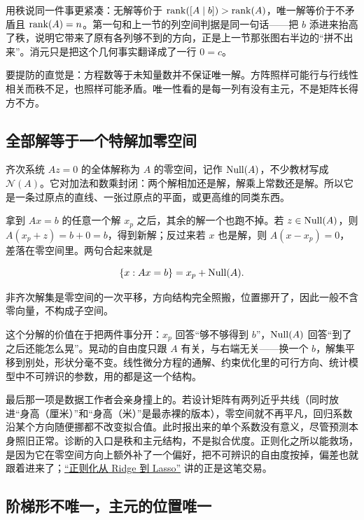 用秩说同一件事更紧凑：无解等价于 \(\operatorname{rank}([A\mid b])>\operatorname{rank}(A)\)，唯一解等价于不矛盾且 \(\operatorname{rank}(A)=n\)。第一句和上一节的列空间判据是同一句话——把 \(b\) 添进来抬高了秩，说明它带来了原有各列够不到的方向，正是上一节那张图右半边的``拼不出来''。消元只是把这个几何事实翻译成了一行 \(0=c\)。

要提防的直觉是：方程数等于未知量数并不保证唯一解。方阵照样可能行与行线性相关而秩不足，也照样可能矛盾。唯一性看的是每一列有没有主元，不是矩阵长得方不方。

\subsection{全部解等于一个特解加零空间}

齐次系统 \(Az=0\) 的全体解称为 \(A\) 的零空间，记作 \(\operatorname{Null}(A)\)，不少教材写成 \(\mathcal N(A)\)。它对加法和数乘封闭：两个解相加还是解，解乘上常数还是解。所以它是一条过原点的直线、一张过原点的平面，或更高维的同类东西。

拿到 \(Ax=b\) 的任意一个解 \(x_p\) 之后，其余的解一个也跑不掉。若 \(z\in\operatorname{Null}(A)\)，则 \(A(x_p+z)=b+0=b\)，得到新解；反过来若 \(x\) 也是解，则 \(A(x-x_p)=0\)，差落在零空间里。两句合起来就是

\[
\left\{x:Ax=b\right\}=x_p+\operatorname{Null}(A).
\]

非齐次解集是零空间的一次平移，方向结构完全照搬，位置挪开了，因此一般不含零向量，不构成子空间。

这个分解的价值在于把两件事分开：\(x_p\) 回答``够不够得到 \(b\)''，\(\operatorname{Null}(A)\) 回答``到了之后还能怎么晃''。晃动的自由度只跟 \(A\) 有关，与右端无关——换一个 \(b\)，解集平移到别处，形状分毫不变。线性微分方程的通解、约束优化里的可行方向、统计模型中不可辨识的参数，用的都是这一个结构。

\begin{remark}
最后那一项是数据工作者会亲身撞上的。若设计矩阵有两列近乎共线（同时放进``身高（厘米）''和``身高（米）''是最赤裸的版本），零空间就不再平凡，回归系数沿某个方向随便挪都不改变拟合值。此时报出来的单个系数没有意义，尽管预测本身照旧正常。诊断的入口是秩和主元结构，不是拟合优度。正则化之所以能救场，是因为它在零空间方向上额外补了一个偏好，把不可辨识的自由度按掉，偏差也就跟着进来了；\hyperref[sec:13-Machine-Learning/02-Linear-Models/02]{``正则化从 Ridge 到 Lasso''} 讲的正是这笔交易。
\end{remark}

\subsection{阶梯形不唯一，主元的位置唯一}

